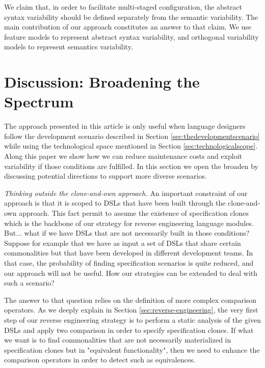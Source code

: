 We claim that, in order to facilitate multi-staged configuration, the abstract syntax variability should be defined separately from the semantic variability. The main contribution of our approach constitutes an answer to that claim. We use feature models to represent abstract syntax variability, and orthogonal variability models to represent semantics variability.  

\section{Discussion: Broadening the Spectrum}

The approach presented in this article is only useful when language designers follow the development scenario described in Section \ref{sec:thedevelopmentscenario} while using the technological space mentioned in Section \ref{sec:technologicalscope}. Along this paper we show how we can reduce maintenance costs and exploit variability if those conditions are fulfilled. In this section we open the broaden by discussing potential directions to support more diverse scenarios. 

\vspace{2mm}
\textit{Thinking outside the clone-and-own approach.} An important constraint of our approach is that it is scoped to DSLs that have been built through the clone-and-own approach. This fact permit to assume the existence of specification clones which is the backbone of our strategy for reverse engineering language modules. But... what if we have DSLs that are not necessarily built in those conditions? Suppose for example that we have as input a set of DSLs that share certain commonalities but that have been developed in different development teams. In that case, the probability of finding specification scenarios is quite reduced, and our approach will not be useful. How our strategies can be extended to deal with such a scenario?

The answer to that question relies on the definition of more complex comparison operators. As we deeply explain in Section \ref{sec:reverse-engineering}, the very first step of our reverse engineering strategy is to perform a static analysis of the given DSLs and apply two comparison in order to specify specification clones. If what we want is to find commonalities that are not necessarily materialized in specification clones but in "equivalent functionality", then we need to enhance the comparison operators in order to detect such as equivalences. 


